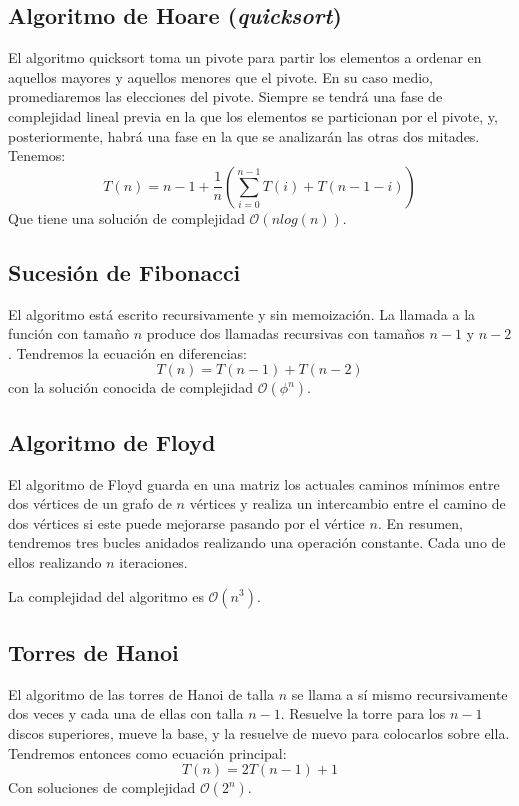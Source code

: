 \documentclass[a4paper, 11pt]{article} %
\begin{document}
\subsection{Algoritmo de Hoare (\textit{quicksort})}
El algoritmo quicksort toma un pivote para partir los elementos a ordenar en aquellos mayores y aquellos menores que el pivote.
En su caso medio, promediaremos las elecciones del pivote. Siempre se tendrá una fase de complejidad lineal previa en la que los
elementos se particionan por el pivote, y, posteriormente, habrá una fase en la que se analizarán las otras dos mitades. Tenemos:
\begin{equation}
 T(n) = n - 1 + \frac{1}{n}\left(\sum_{i=0}^{n-1} T(i) + T(n-1-i) \right)
\end{equation}
Que tiene una solución de complejidad $\mathcal{O}(nlog(n))$.


\subsection {Sucesión de Fibonacci}
El algoritmo está escrito recursivamente y sin memoización. La llamada a la función con tamaño $n$ produce 
dos llamadas recursivas con tamaños $n-1$ y $n-2$. Tendremos la ecuación en diferencias:
\begin{equation}
 T(n) = T(n-1) + T(n-2)
\end{equation}
con la solución conocida de complejidad $\mathcal{O}(\phi^n)$.

\subsection{Algoritmo de Floyd}
El algoritmo de Floyd guarda en una matriz los actuales caminos mínimos entre dos vértices de un grafo de $n$ vértices
y realiza un intercambio entre el camino de dos vértices si este puede mejorarse pasando por el vértice $n$. En resumen,
tendremos tres bucles anidados realizando una operación constante. Cada uno de ellos realizando $n$ iteraciones.

La complejidad del algoritmo es $\mathcal{O}(n^3)$.


\subsection{Torres de Hanoi}
El algoritmo de las torres de Hanoi de talla $n$ se llama a sí mismo recursivamente dos veces y cada una de ellas con
talla $n-1$. Resuelve la torre para los $n-1$ discos superiores, mueve la base, y la resuelve de nuevo para colocarlos sobre ella.
Tendremos entonces como ecuación principal:
\begin{equation}
 T(n) = 2T(n-1) + 1
\end{equation}
Con soluciones de complejidad $\mathcal{O}(2^n)$.
\end{document}
